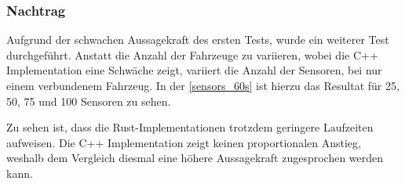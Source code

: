 \subsubsection{Nachtrag}

Aufgrund der schwachen Aussagekraft des ersten Tests, wurde ein weiterer Test durchgeführt. Anstatt die Anzahl der Fahrzeuge zu variieren, wobei die C++ Implementation eine Schwäche zeigt, variiert die Anzahl der Sensoren, bei nur einem verbundenem Fahrzeug.
In der \autoref{sensors_60s} ist hierzu das Resultat für 25, 50, 75 und 100 Sensoren zu sehen.


Zu sehen ist, dass die Rust-Implementationen trotzdem geringere Laufzeiten aufweisen.
Die C++ Implementation zeigt keinen proportionalen Anstieg, weshalb dem Vergleich diesmal eine höhere Aussagekraft zugesprochen werden kann.


